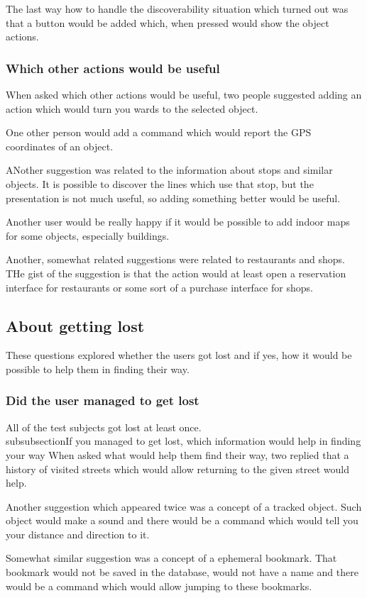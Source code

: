 \documentclass[nolof,digital]{fithesis3}
\begin{document}
The last way how to handle the discoverability situation which turned out was that a button would be added which, when pressed would show the object actions.
\subsubsection{Which other actions would be useful}
When asked which other actions would be useful, two people suggested adding an action which would turn you wards to the selected object.

One other person would add a command which would report the GPS coordinates of an object.

ANother suggestion was related to the information about stops and similar objects. It is possible to discover the lines which use that stop, but the presentation is not much useful, so adding something better would be useful.

Another user would be really happy if it would be possible to add indoor maps for some objects, especially buildings.

Another, somewhat related suggestions were related to restaurants and shops. THe gist of the suggestion is that the action would at least open a reservation interface for restaurants or some sort of a purchase interface for shops.
\subsection{About getting lost}
These questions explored whether the users got lost and if yes, how it would be possible to help them in finding their way.
\subsubsection{Did the user managed to get lost}
All of the test subjects got lost at least once.
\\subsubsection{If you managed to get lost, which information would help in finding your way}
When asked what would help them find their way, two replied that a history of visited streets which would allow returning to the given street would help.

Another suggestion which appeared twice was a concept of a tracked object. Such object would make a sound and there would be a command which would tell you your distance and direction to it.

Somewhat similar suggestion was a concept of a ephemeral bookmark. That bookmark would not be saved in the database, would not have a name and there would be a command which would allow jumping to these bookmarks.
\end{document}
